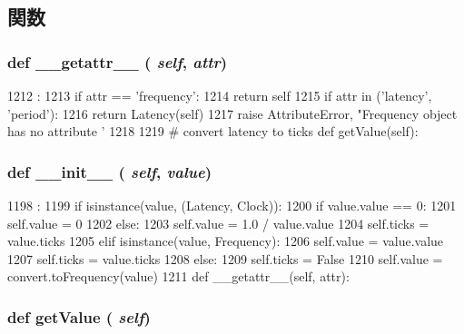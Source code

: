 \subsection{関数}
\hypertarget{classm5_1_1params_1_1Frequency_a0a990b3ec3889d40889daca9ee5e4695}{
\subsubsection[{\_\-\_\-getattr\_\-\_\-}]{\setlength{\rightskip}{0pt plus 5cm}def \_\-\_\-getattr\_\-\_\- ( {\em self}, \/   {\em attr})}}
\label{classm5_1_1params_1_1Frequency_a0a990b3ec3889d40889daca9ee5e4695}



\begin{DoxyCode}
1212                                :
1213         if attr == 'frequency':
1214             return self
1215         if attr in ('latency', 'period'):
1216             return Latency(self)
1217         raise AttributeError, "Frequency object has no attribute '%
1218 
1219     # convert latency to ticks
    def getValue(self):
\end{DoxyCode}
\hypertarget{classm5_1_1params_1_1Frequency_ac775ee34451fdfa742b318538164070e}{
\subsubsection[{\_\-\_\-init\_\-\_\-}]{\setlength{\rightskip}{0pt plus 5cm}def \_\-\_\-init\_\-\_\- ( {\em self}, \/   {\em value})}}
\label{classm5_1_1params_1_1Frequency_ac775ee34451fdfa742b318538164070e}



\begin{DoxyCode}
1198                              :
1199         if isinstance(value, (Latency, Clock)):
1200             if value.value == 0:
1201                 self.value = 0
1202             else:
1203                 self.value = 1.0 / value.value
1204             self.ticks = value.ticks
1205         elif isinstance(value, Frequency):
1206             self.value = value.value
1207             self.ticks = value.ticks
1208         else:
1209             self.ticks = False
1210             self.value = convert.toFrequency(value)
1211 
    def __getattr__(self, attr):
\end{DoxyCode}
\hypertarget{classm5_1_1params_1_1Frequency_acc340fbd4335fa34f9d57fb454b28ed0}{
\subsubsection[{getValue}]{\setlength{\rightskip}{0pt plus 5cm}def getValue ( {\em self})}}
\label{classm5_1_1params_1_1Frequency_acc340fbd4335fa34f9d57fb454b28ed0}


